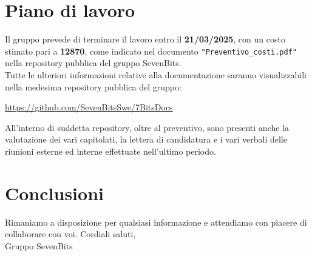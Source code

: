 \documentclass[10pt]{article}
\begin{document}
\section{Piano di lavoro}
Il gruppo prevede di terminare il lavoro entro il \textbf{21/03/2025}, con un costo stimato pari a \textbf{12870\texteuro}, come indicato nel documento 
\texttt{"Preventivo\_costi.pdf"} nella repository pubblica del gruppo SevenBits.\\
Tutte le ulteriori informazioni relative alla documentazione saranno visualizzabili nella medesima repository pubblica del gruppo:\\
\begin{center}
\url{https://github.com/SevenBitsSwe/7BitsDocs}\\    
\end{center}
\vspace{2mm}
All'interno di suddetta repository, oltre al preventivo, sono presenti anche la valutazione dei vari capitolati, la lettera di candidatura e i vari verbali delle 
riunioni esterne ed interne effettuate nell'ultimo periodo.


\section{Conclusioni}
Rimaniamo a disposizione per qualsiasi informazione e attendiamo con piacere di collaborare con voi.
\vspace{2mm}
\newline
Cordiali saluti,\\
Gruppo SevenBits
\end{document}
